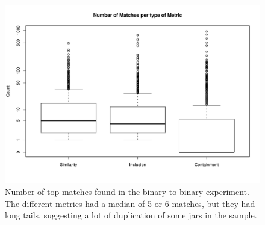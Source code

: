 
\begin{figure}[h]
  \centering
\includegraphics[width=\columnwidth]{plots/boxplotPerfectMatches.pdf}  
\vspace{-7mm}
  \caption{Number of top-matches found in the binary-to-binary
    experiment. The different metrics had a median of 5 or 6 matches,
    but they had long tails, suggesting a lot of duplication of some
    jars in the sample. }
  \label{fig:topMatchesSource}
\end{figure}


